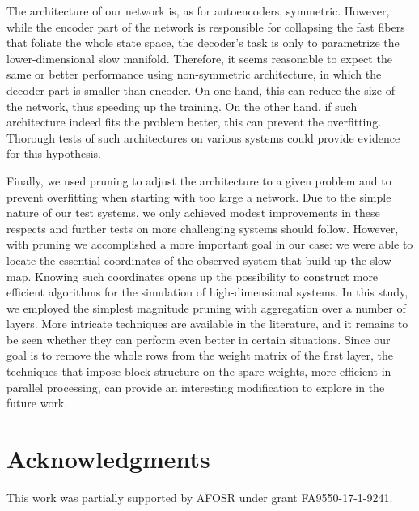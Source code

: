 \documentclass{article}
\begin{document}
The architecture of our network is, as for autoencoders, symmetric. However, while the encoder part of the network is responsible for collapsing the fast fibers that foliate the whole state space, the decoder's task is only to parametrize the lower-dimensional slow manifold. Therefore, it seems reasonable to expect the same or better performance using non-symmetric architecture, in which the decoder part is smaller than encoder. On one hand, this can reduce the size of the network, thus speeding up the training. On the other hand, if such architecture indeed fits the problem better, this can prevent the overfitting. Thorough tests of such architectures on various systems could provide evidence for this hypothesis.

Finally, we used pruning to adjust the architecture to a given problem and to prevent overfitting when starting with too large a network. Due to the simple nature of our test systems, we only achieved modest improvements in these respects and further tests on more challenging systems should follow. However, with pruning we accomplished a more important goal in our case: we were able to locate the essential coordinates of the observed system that build up the slow map. Knowing such coordinates opens up the possibility to construct more efficient algorithms for the simulation of high-dimensional systems. In this study, we employed the simplest magnitude pruning with aggregation over a number of layers. More intricate techniques are available in the literature, and it remains to be seen whether they can perform even better in certain situations. Since our goal is to remove the whole rows from the weight matrix of the first layer, the techniques that impose block structure on the spare weights, more efficient in parallel processing, can provide an interesting modification to explore in the future work.

\section*{Acknowledgments}
This work was partially supported by AFOSR under grant FA9550-17-1-9241.

\printbibliography 
% 
% 
\end{document}

